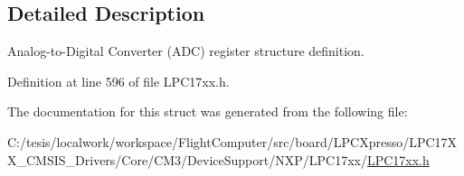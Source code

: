\subsection{\-Detailed \-Description}
\-Analog-\/to-\/\-Digital \-Converter (\-A\-D\-C) register structure definition. 

\-Definition at line 596 of file \-L\-P\-C17xx.\-h.



\-The documentation for this struct was generated from the following file\-:\begin{DoxyCompactItemize}
\item 
\-C\-:/tesis/localwork/workspace/\-Flight\-Computer/src/board/\-L\-P\-C\-Xpresso/\-L\-P\-C17\-X\-X\-\_\-\-C\-M\-S\-I\-S\-\_\-\-Drivers/\-Core/\-C\-M3/\-Device\-Support/\-N\-X\-P/\-L\-P\-C17xx/\hyperlink{_l_p_c17xx_8h}{\-L\-P\-C17xx.\-h}\end{DoxyCompactItemize}
